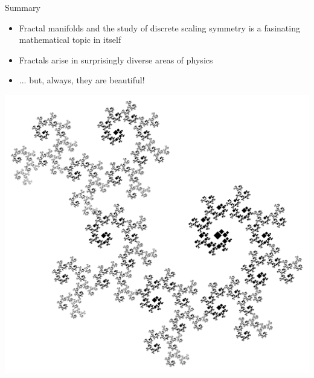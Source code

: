 \documentclass[xcolor=x11names,compress,professionalfonts]{beamer}
\renewcommand{\(}{\begin{columns}}
\renewcommand{\)}{\end{columns}}
\newcommand{\<}[1]{\begin{column}{#1}}
\renewcommand{\>}{\end{column}}
\begin{document}
\begin{frame}{Summary}

    \begin{itemize}
        \item Fractal manifolds and the study of discrete scaling symmetry is a fasinating mathematical topic in itself
        \item Fractals arise in surprisingly diverse areas of physics
        \item ... but, always, they are beautiful!
    \end{itemize}
    
     {\centering
    	\includegraphics[scale=.15]{dragon.png}
    	
     }
\end{frame}
\end{document}
